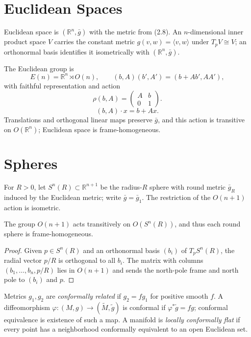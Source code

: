 \section{Euclidean Spaces}

Euclidean space is $(\mathbb R^n,\bar g)$ with the metric from (2.8). An $n$-dimensional inner product space $V$ carries the constant metric $g(v,w)=\langle v,w\rangle$ under $T_pV\cong V$; an orthonormal basis identifies it isometrically with $(\mathbb R^n,\bar g)$.

The Euclidean group is
\[
E(n)=\mathbb R^n\rtimes O(n),\qquad (b,A)(b',A')=(b+Ab',AA'),
\]
with faithful representation and action
\[
\rho(b,A)=\begin{pmatrix}A&b\\0&1\end{pmatrix}.
\]
\begin{equation}
(b,A)\cdot x=b+Ax.\tag{3.2}
\end{equation}
Translations and orthogonal linear maps preserve $\bar g$, and this action is transitive on $O(\mathbb R^n)$; Euclidean space is frame-homogeneous.

\section{Spheres}

For $R>0$, let $S^n(R)\subset\mathbb R^{n+1}$ be the radius-$R$ sphere with round metric $\bar g_R$ induced by the Euclidean metric; write $\bar g=\bar g_1$. The restriction of the $O(n+1)$ action is isometric.

\begin{proposition}
\label{prop:frame-homogeneous-sphere}
The group $O(n+1)$ acts transitively on $O(S^n(R))$, and thus each round sphere is frame-homogeneous.
\end{proposition}
\begin{proof}
\sketch Given $p\in S^n(R)$ and an orthonormal basis $(b_i)$ of $T_pS^n(R)$, the radial vector $p/R$ is orthogonal to all $b_i$. The matrix with columns $(b_1,\ldots,b_n,p/R)$ lies in $O(n+1)$ and sends the north-pole frame and north pole to $(b_i)$ and $p$.
\end{proof}

Metrics $g_1,g_2$ are \emph{conformally related} if $g_2=fg_1$ for positive smooth $f$. A diffeomorphism $\varphi:(M,g)\to(\widetilde M,\widetilde g)$ is conformal if $\varphi^*\widetilde g=fg$; conformal equivalence is existence of such a map. A manifold is \emph{locally conformally flat} if every point has a neighborhood conformally equivalent to an open Euclidean set.

